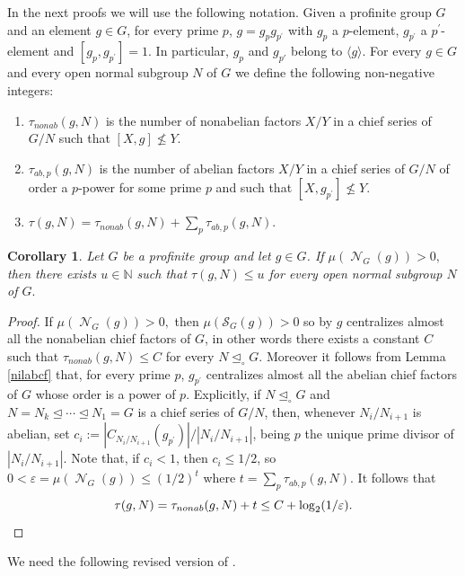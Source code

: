\documentclass{amsart}
\DeclareMathOperator{\nil}{\mathcal N}
\newtheorem{cor}[thm]{Corollary}
\numberwithin{equation}{section}
\begin{document}
In the next proofs we will use the following notation. Given a profinite group $G$ and an element $g \in G$, for every prime $p$, $g=g_pg_{p^\prime}$ with $g_p$ a $p$-element, $g_{p^\prime}$ a $p^\prime$-element and $[g_p,g_{p^\prime}]=1.$ In particular, $g_p$ and $g_{p'}$ belong to $\langle g \rangle$. For every $g\in G$ and every open normal subgroup $N$ of $G$ we define the following non-negative integers:
\begin{enumerate}
	\item $\tau_{nonab}(g,N)$ is the number of nonabelian factors $X/Y$ in a chief series of $G/N$ such that $[X,g]\not\leq Y.$
	\item $\tau_{ab,p}(g,N)$ is the number of abelian factors $X/Y$ in a chief series of $G/N$ of order a $p$-power for some prime $p$ and such that $[X,g_{p^\prime}]\not\leq Y.$
	\item $\tau(g,N)=\tau_{nonab}(g,N)+\sum_p\tau_{ab,p}(g,N)$.
\end{enumerate}
	
	\begin{cor}\label{cencf}
		Let $G$ be a profinite group and let $g \in G$. If $\mu(\nil_G(g))>0,$ then there exists $u\in \mathbb N$ such that $\tau(g,N)\leq u$ for every open normal subgroup $N$ of $G.$
	\end{cor}
	
\begin{proof}
If $\mu(\nil_G(g))>0,$ then $\mu(\mathcal S_G(g))>0$ so by \cite[Corollary 1.3]{fgg} $g$ centralizes almost all the nonabelian chief factors of $G$, in other words there exists a constant $C$ such that $\tau_{nonab}(g,N) \leq C$ for every $N \unlhd_{\circ} G$. Moreover it follows from Lemma \ref{nilabcf} that, for every prime $p$, $g_{p^\prime}$ centralizes almost all the abelian chief factors of $G$ whose order is a power of $p$. Explicitly, if $N \unlhd_{\circ} G$ and $N = N_k \unlhd \cdots \unlhd  N_1 = G$ is a chief series of $G/N$, then, whenever $N_i/N_{i+1}$ is abelian, set $c_i := |C_{N_i/N_{i+1}}(g_{p^\prime})|/|N_i/N_{i+1}|$, being $p$ the unique prime divisor of $|N_i/N_{i+1}|.$
Note that, if $c_i < 1$, then $c_i \leq 1/2$, so $0 < \varepsilon = \mu(\nil_G(g)) \leq (1/2)^t$ where $t=\sum_p\tau_{ab,p}(g,N).$ It follows that $$\tau(g,N) = \tau_{nonab}(g,N) + t \leq C+\log_2(1/\varepsilon).\qedhere$$
\end{proof}

We need the following revised version of \cite[Theorem 25]{pel}.
\end{document}
